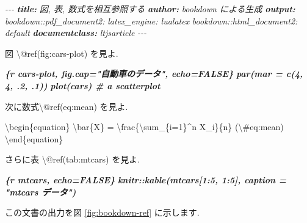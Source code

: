 \documentclass[
  11pt,
  lualatex,
  ja=standard]{bxjsreport}
\newenvironment{Shaded}{\begin{snugshade}}{\end{snugshade}}
\newcommand{\AnnotationTok}[1]{\textcolor[rgb]{0.56,0.35,0.01}{\textbf{\textit{#1}}}}
\newcommand{\CommentTok}[1]{\textcolor[rgb]{0.56,0.35,0.01}{\textit{#1}}}
\newcommand{\InformationTok}[1]{\textcolor[rgb]{0.56,0.35,0.01}{\textbf{\textit{#1}}}}
\newcommand{\NormalTok}[1]{#1}
\newcommand{\SpecialCharTok}[1]{\textcolor[rgb]{0.00,0.00,0.00}{#1}}
\begin{document}
\begin{Shaded}
\begin{Highlighting}[]
\CommentTok{{-}{-}{-}}
\AnnotationTok{title:}\CommentTok{ 図, 表, 数式を相互参照する}
\AnnotationTok{author:}\CommentTok{ bookdown による生成}
\AnnotationTok{output:}
\CommentTok{  bookdown::pdf\_document2:}
\CommentTok{    latex\_engine: lualatex}
\CommentTok{  bookdown::html\_document2: default}
\AnnotationTok{documentclass:}\CommentTok{ ltjsarticle}
\CommentTok{{-}{-}{-}}

\NormalTok{図 \textbackslash{}@ref(fig:cars{-}plot) を見よ.}

\InformationTok{\textasciigrave{}\textasciigrave{}\textasciigrave{}\{r cars{-}plot, fig.cap="自動車のデータ", echo=FALSE\}}
\InformationTok{par(mar = c(4, 4, .2, .1))}
\InformationTok{plot(cars)  \# a scatterplot}
\InformationTok{\textasciigrave{}\textasciigrave{}\textasciigrave{}}

\NormalTok{次に数式\textbackslash{}@ref(eq:mean) を見よ.}

\NormalTok{\textbackslash{}begin\{equation\}}
\NormalTok{\textbackslash{}bar\{X\} = \textbackslash{}frac\{\textbackslash{}sum\_\{i=1\}\^{}n X\_i\}\{n\} (}\SpecialCharTok{\textbackslash{}\#}\NormalTok{eq:mean)}
\NormalTok{\textbackslash{}end\{equation\}}

\NormalTok{さらに表 \textbackslash{}@ref(tab:mtcars) を見よ.}

\InformationTok{\textasciigrave{}\textasciigrave{}\textasciigrave{}\{r mtcars, echo=FALSE\}}
\InformationTok{knitr::kable(mtcars[1:5, 1:5], caption = "mtcars データ")}
\InformationTok{\textasciigrave{}\textasciigrave{}\textasciigrave{}}
\end{Highlighting}
\end{Shaded}

この文書の出力を図 \ref{fig:bookdown-ref} に示します.
\end{document}
